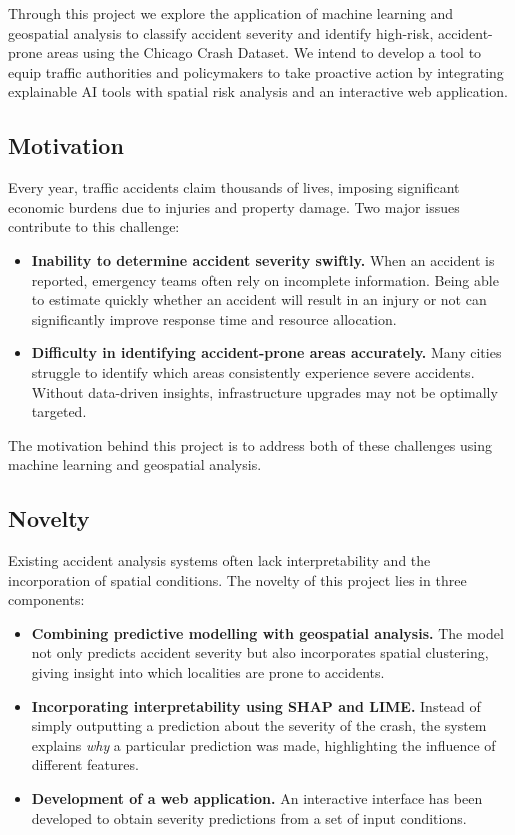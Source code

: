 \documentclass[11pt,a4paper]{article}
\begin{document}
Through this project we explore the application of machine learning and geospatial analysis to
classify accident severity and identify high-risk, accident-prone areas using the Chicago Crash
Dataset. We intend to develop a tool to equip traffic authorities and policymakers to take
proactive action by integrating explainable AI tools with spatial risk analysis and an interactive
web application.

\subsection{Motivation}

Every year, traffic accidents claim thousands of lives, imposing significant economic burdens due
to injuries and property damage. Two major issues contribute to this challenge:

\begin{itemize}
  \item \textbf{Inability to determine accident severity swiftly.} When an accident is reported,
    emergency teams often rely on incomplete information. Being able to estimate quickly whether an
    accident will result in an injury or not can significantly improve response time and resource
    allocation.
  \item \textbf{Difficulty in identifying accident-prone areas accurately.} Many cities struggle to
    identify which areas consistently experience severe accidents. Without data-driven insights,
    infrastructure upgrades may not be optimally targeted.
\end{itemize}

The motivation behind this project is to address both of these challenges using machine learning
and geospatial analysis.

\subsection{Novelty}

Existing accident analysis systems often lack interpretability and the incorporation of spatial
conditions. The novelty of this project lies in three components:

\begin{itemize}
  \item \textbf{Combining predictive modelling with geospatial analysis.} The model not only
    predicts accident severity but also incorporates spatial clustering, giving insight into which
    localities are prone to accidents.
  \item \textbf{Incorporating interpretability using SHAP and LIME.} Instead of simply outputting a
    prediction about the severity of the crash, the system explains \emph{why} a particular
    prediction was made, highlighting the influence of different features.
  \item \textbf{Development of a web application.} An interactive interface has been developed to
    obtain severity predictions from a set of input conditions.
\end{itemize}
\end{document}
